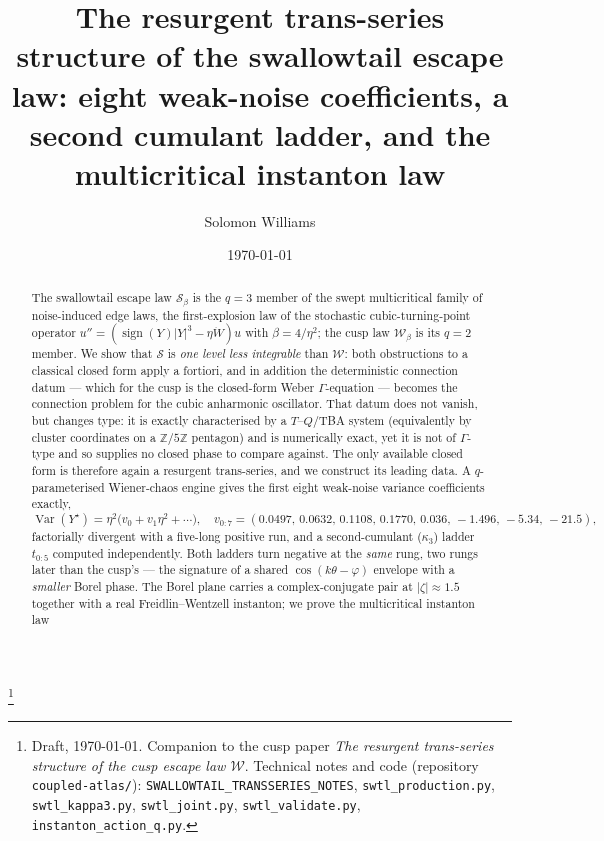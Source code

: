 \documentclass[11pt,reqno]{amsart}
\theoremstyle{plain}
\theoremstyle{definition}
\theoremstyle{remark}
\newcommand{\W}{\mathcal{W}}
\newcommand{\Sw}{\mathcal{S}}
\DeclareMathOperator{\Var}{Var}
\begin{document}
\title[Resurgent structure of the swallowtail edge law]{The resurgent trans-series structure of
the swallowtail escape law: eight weak-noise coefficients, a second cumulant ladder, and the
multicritical instanton law}
\author{Solomon Williams}
\address{School of Mathematics, University of Edinburgh, Edinburgh EH9 3FD, United Kingdom}
\thanks{Draft, \today. Companion to the cusp paper \emph{The resurgent trans-series structure of
the cusp escape law $\W$}. Technical notes and code (repository \texttt{coupled-atlas/}):
\texttt{SWALLOWTAIL\_TRANSSERIES\_NOTES}, \texttt{swtl\_production.py},
\texttt{swtl\_kappa3.py}, \texttt{swtl\_joint.py}, \texttt{swtl\_validate.py},
\texttt{instanton\_action\_q.py}.}
\date{\today}

\begin{abstract}
The swallowtail escape law $\Sw_\beta$ is the $q=3$ member of the swept multicritical family of
noise-induced edge laws, the first-explosion law of the stochastic cubic-turning-point operator
$u''=(\operatorname{sign}(Y)|Y|^3-\eta\dot W)u$ with $\beta=4/\eta^2$; the cusp law $\W_\beta$ is
its $q=2$ member. We show that $\Sw$ is \emph{one level less integrable} than $\W$: both
obstructions to a classical closed form apply a fortiori, and in addition the deterministic
connection datum --- which for the cusp is the closed-form Weber $\Gamma$-equation --- becomes the
connection problem for the cubic anharmonic oscillator. That datum does not vanish, but changes
type: it is exactly characterised by a $T$--$Q$/TBA system (equivalently by cluster coordinates on
a $\mathbb Z/5\mathbb Z$ pentagon) and is numerically exact, yet it is not of $\Gamma$-type and so
supplies no closed phase to compare against.
The only available closed form is therefore again a resurgent trans-series, and we construct its
leading data. A $q$-parameterised Wiener-chaos engine gives the first eight weak-noise variance
coefficients exactly,
\[
\Var(Y^\star)=\eta^2\bigl(v_0+v_1\eta^2+\cdots\bigr),\quad
v_{0:7}=(0.0497,\,0.0632,\,0.1108,\,0.1770,\,0.036,\,-1.496,\,-5.34,\,-21.5),
\]
factorially divergent with a five-long positive run, and a second-cumulant ($\kappa_3$) ladder
$t_{0:5}$ computed independently. Both ladders turn negative at the \emph{same} rung, two rungs
later than the cusp's --- the signature of a shared $\cos(k\theta-\varphi)$ envelope with a
\emph{smaller} Borel phase. The Borel plane carries a complex-conjugate pair at $|\zeta|\approx1.5$
together with a real Freidlin--Wentzell instanton; we prove the multicritical instanton law

\end{abstract}
\end{document}

